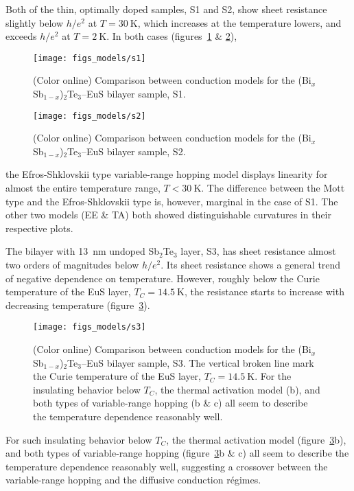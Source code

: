 Both of the thin, optimally doped samples, S1 and S2, show sheet resistance slightly below $h/e^2$ at $T = 30~\mathrm{K}$, which increases at the temperature lowers, and exceeds $h/e^2$ at $T = 2~\mathrm{K}$. In both cases (figures~\ref{fig:models_s1} \& \ref{fig:models_s2}),%
%
\begin{figure}[ht]%
    \centering%
    \texttt{[image: figs\_models/s1]}%
    \caption[Conduction model comparison: (Bi$_x$Sb$_{1-x}$)$_2$Te$_3$--EuS bilayer: S1]{\label{fig:models_s1}(Color online) Comparison between conduction models for the (Bi$_x$Sb$_{1-x}$)$_2$Te$_3$--EuS bilayer sample, S1.}%
\end{figure}%
%
\begin{figure}[ht]%
    \centering%
    \texttt{[image: figs\_models/s2]}%
    \caption[Conduction model comparison: (Bi$_x$Sb$_{1-x}$)$_2$Te$_3$--EuS bilayer: S2]{\label{fig:models_s2}(Color online) Comparison between conduction models for the (Bi$_x$Sb$_{1-x}$)$_2$Te$_3$--EuS bilayer sample, S2.}%
\end{figure} %
%
the Efros-Shklovskii type variable-range hopping model displays linearity for almost the entire temperature range, $T < 30~\mathrm{K}$. The difference between the Mott type and the Efros-Shklovskii type is, however, marginal in the case of S1. The other two models (EE \& TA) both showed distinguishable curvatures in their respective plots.

The bilayer with \SI{13}{nm} undoped Sb$_2$Te$_3$ layer, S3, has sheet resistance almost two orders of magnitudes below $h/e^2$. Its sheet resistance shows a general trend of negative dependence on temperature. However, roughly below the Curie temperature of the EuS layer, $T_C = 14.5~\mathrm{K}$, the resistance starts to increase with decreasing temperature (figure~\ref{fig:models_s3}).%
%
\begin{figure}[ht]%
    \centering%
    \texttt{[image: figs\_models/s3]}%
    \caption[Conduction model comparison: (Bi$_x$Sb$_{1-x}$)$_2$Te$_3$--EuS bilayer: S3]{\label{fig:models_s3}(Color online) Comparison between conduction models for the (Bi$_x$Sb$_{1-x}$)$_2$Te$_3$--EuS bilayer sample, S3. The vertical broken line mark the Curie temperature of the EuS layer, $T_C = 14.5~\mathrm{K}$. For the insulating behavior below $T_C$, the thermal activation model (b), and both types of variable-range hopping (b \& c) all seem to describe the temperature dependence reasonably well.}%
\end{figure} %
For such insulating behavior below $T_C$, the thermal activation model (figure~\ref{fig:models_s3}b), and both types of variable-range hopping (figure~\ref{fig:models_s3}b \& c) all seem to describe the temperature dependence reasonably well, suggesting a crossover between the variable-range hopping and the diffusive conduction r\'egimes.

